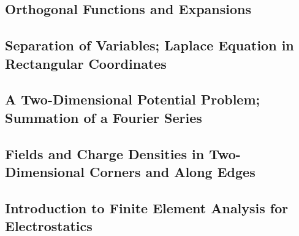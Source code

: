 \subsection{Orthogonal Functions and Expansions}

\subsection{Separation of Variables; Laplace Equation in Rectangular Coordinates}

\subsection{A Two-Dimensional Potential Problem; Summation of a Fourier Series}

\subsection{Fields and Charge Densities in Two-Dimensional Corners and Along Edges}

\subsection{Introduction to Finite Element Analysis for Electrostatics}





